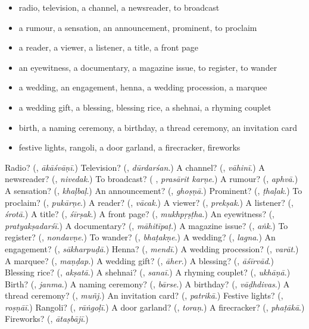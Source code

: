 \begin{itemize}
\raggedright
  \item radio, television, a channel, a newsreader, to broadcast
  \item a rumour, a sensation, an announcement, prominent, to proclaim
  \item a reader, a viewer, a listener, a title, a front page
  \item an eyewitness, a documentary, a magazine issue, to register, to wander
  \item a wedding, an engagement, henna, a wedding procession, a marquee
  \item a wedding gift, a blessing, blessing rice, a shehnai, a rhyming couplet
  \item birth, a naming ceremony, a birthday, a thread ceremony, an invitation card
  \item festive lights, rangoli, a door garland, a firecracker, fireworks
\end{itemize}

\begin{tcolorbox}[breakable,colback=teal!4,colframe=teal!35!black,title={Before you move on}]
Radio? (\textbf{}, \emph{ākāśvāṇī}.) Television? (\textbf{}, \emph{dūrdarśan}.) A channel? (\textbf{}, \emph{vāhinī}.) A newsreader? (\textbf{}, \emph{nivedak}.) To broadcast? (\textbf{ }, \emph{prasārit karṇe}.) A rumour? (\textbf{}, \emph{aphvā}.) A sensation? (\textbf{}, \emph{khaḷbaḷ}.) An announcement? (\textbf{}, \emph{ghoṣṇā}.) Prominent? (\textbf{}, \emph{ṭhaḷak}.) To proclaim? (\textbf{}, \emph{pukārṇe}.) A reader? (\textbf{}, \emph{vācak}.) A viewer? (\textbf{}, \emph{prekṣak}.) A listener? (\textbf{}, \emph{śrotā}.) A title? (\textbf{}, \emph{śīrṣak}.) A front page? (\textbf{}, \emph{mukhpṛṣṭha}.) An eyewitness? (\textbf{}, \emph{pratyakṣadarśī}.) A documentary? (\textbf{}, \emph{māhitīpaṭ}.) A magazine issue? (\textbf{}, \emph{aṅk}.) To register? (\textbf{}, \emph{nondavṇe}.) To wander? (\textbf{}, \emph{bhaṭakṇe}.) A wedding? (\textbf{}, \emph{lagna}.) An engagement? (\textbf{}, \emph{sākharpuḍā}.) Henna? (\textbf{}, \emph{mendī}.) A wedding procession? (\textbf{}, \emph{varāt}.) A marquee? (\textbf{}, \emph{maṇḍap}.) A wedding gift? (\textbf{}, \emph{āher}.) A blessing? (\textbf{}, \emph{āśīrvād}.) Blessing rice? (\textbf{}, \emph{akṣatā}.) A shehnai? (\textbf{}, \emph{sanaī}.) A rhyming couplet? (\textbf{}, \emph{ukhāṇā}.) Birth? (\textbf{}, \emph{janma}.) A naming ceremony? (\textbf{}, \emph{bārse}.) A birthday? (\textbf{}, \emph{vāḍhdivas}.) A thread ceremony? (\textbf{}, \emph{muñj}.) An invitation card? (\textbf{}, \emph{patrikā}.) Festive lights? (\textbf{}, \emph{roṣṇāī}.) Rangoli? (\textbf{}, \emph{rāṅgoḷī}.) A door garland? (\textbf{}, \emph{toraṇ}.) A firecracker? (\textbf{}, \emph{phaṭākā}.) Fireworks? (\textbf{}, \emph{ātaṣbājī}.)
\end{tcolorbox}
